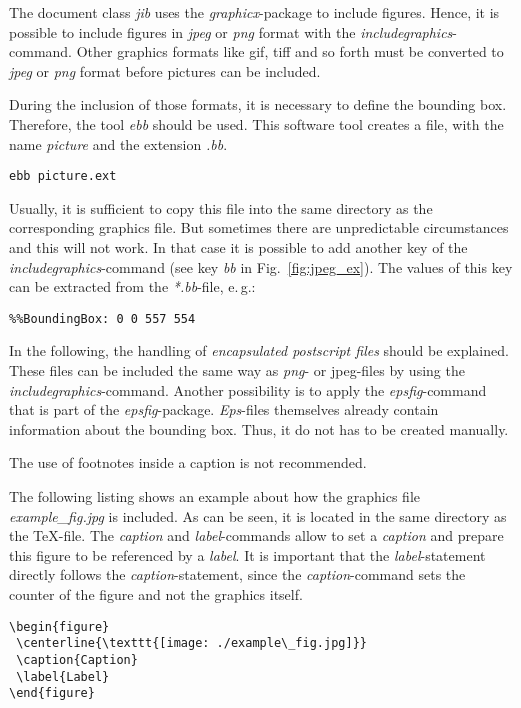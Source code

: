 \documentclass{jib}
\begin{document}
The document class \emph{jib} uses the \emph{graphicx}-package to include
figures. Hence, it is possible to include figures in \emph{jpeg} or \emph{png}
format with the \emph{includegraphics}-command. Other graphics formats like gif,
tiff and so forth must be converted to \emph{jpeg} or \emph{png} format before
pictures can be included.

During the inclusion of those formats, it is necessary to define the bounding
box. Therefore, the tool \emph{ebb} should be used. This software tool creates a
file, with the name \emph{picture} and the extension \emph{.bb}.

\begin{lstlisting}[emph={picture,ext}] ebb picture.ext
\end{lstlisting}

Usually, it is sufficient to copy this file into the same directory as the
corresponding graphics file. But sometimes there are unpredictable circumstances
and this will not work. In that case it is possible to add another key of the
\emph{includegraphics}-command (see key \emph{bb} in Fig.~\ref{fig:jpeg_ex}). The
values of this key can be extracted from the \emph{*.bb}-file, e.\,g.:

\begin{lstlisting}
%%BoundingBox: 0 0 557 554
\end{lstlisting}

In the following, the handling of \emph{encapsulated postscript files} should be
explained. These files can be included the same way as \emph{png}- or
{jpeg}-files by using the \emph{includegraphics}-command. Another possibility is
to apply the \emph{epsfig}-command that is part of the \emph{epsfig}-package.
\emph{Eps}-files themselves already contain information about the bounding box.
Thus, it do not has to be created manually.

The use of footnotes inside a caption is not recommended.

The following listing shows an example about how the graphics file
\emph{example\_fig.jpg} is included. As can be seen, it is located in the same
directory as the \TeX-file. The \emph{caption} and \emph{label}-commands allow
to set a \emph{caption} and prepare this figure to be referenced by a
\emph{label}. It is important that the \emph{label}-statement directly follows
the \emph{caption}-statement, since the \emph{caption}-command sets the counter
of the figure and not the graphics itself.

\begin{lstlisting}[breaklines=true]
\begin{figure}
 \centerline{\texttt{[image: ./example\_fig.jpg]}}
 \caption{Caption}
 \label{Label}
\end{figure}
\end{lstlisting}
\end{document}
